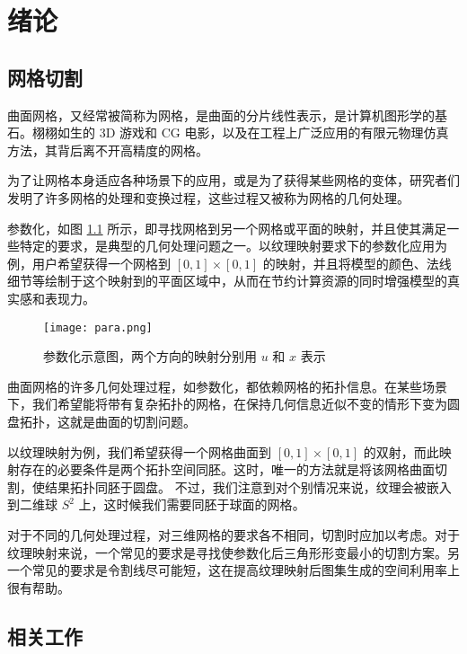 
\chapter{绪论}

\section{网格切割}

曲面网格，又经常被简称为网格，是曲面的分片线性表示，是计算机图形学的基石。栩栩如生的 3D 游戏和 CG 电影，以及在工程上广泛应用的有限元物理仿真方法，其背后离不开高精度的网格。

为了让网格本身适应各种场景下的应用，或是为了获得某些网格的变体，研究者们发明了许多网格的处理和变换过程，这些过程又被称为网格的几何处理。

参数化，如图 \ref{fig:texmapping} 所示，即寻找网格到另一个网格或平面的映射，并且使其满足一些特定的要求，是典型的几何处理问题之一\cite{Floater1997}。以纹理映射要求下的参数化应用为例，用户希望获得一个网格到 $ [0, 1] \times [0, 1] $ 的映射，并且将模型的颜色、法线细节等绘制于这个映射到的平面区域中，从而在节约计算资源的同时增强模型的真实感和表现力\cite{wikitexturemapping}。

\begin{figure}[h]
    \centering
    \texttt{[image: para.png]}
    \caption{参数化示意图，两个方向的映射分别用 $u$ 和 $x$ 表示}
    \label{fig:texmapping}
\end{figure}

曲面网格的许多几何处理过程，如参数化，都依赖网格的拓扑信息。在某些场景下，我们希望能将带有复杂拓扑的网格，在保持几何信息近似不变的情形下变为圆盘拓扑，这就是曲面的切割问题。

以纹理映射为例，我们希望获得一个网格曲面到 $ [0, 1] \times [0, 1] $ 的双射，而此映射存在的必要条件是两个拓扑空间同胚。这时，唯一的方法就是将该网格曲面切割，使结果拓扑同胚于圆盘\cite{Erickson2002}。 不过，我们注意到对个别情况来说，纹理会被嵌入到二维球 $ S^2 $ 上，这时候我们需要同胚于球面的网格\cite{Haker2000}。

对于不同的几何处理过程，对三维网格的要求各不相同，切割时应加以考虑。对于纹理映射来说，一个常见的要求是寻找使参数化后三角形形变最小的切割方案\cite{Floater1997}\cite{Gu2002}。另一个常见的要求是令割线尽可能短，这在提高纹理映射后图集生成的空间利用率上很有帮助\cite{atlasgen}。

\section{相关工作}

